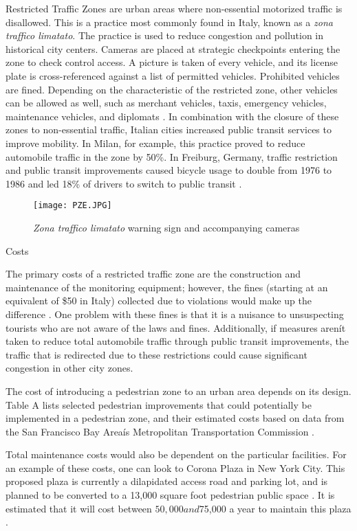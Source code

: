 Restricted Traffic Zones are urban areas where non-essential motorized traffic is disallowed. This is a practice most commonly found in Italy, known as a \emph{zona traffico limatato}. The practice is used to reduce congestion and pollution in historical city centers. Cameras are placed at strategic checkpoints entering the zone to check control access. A picture is taken of every vehicle, and its license plate is cross-referenced against a list of permitted vehicles. Prohibited vehicles are fined. Depending on the characteristic of the restricted zone, other vehicles can be allowed as well, such as merchant vehicles, taxis, emergency vehicles, maintenance vehicles, and diplomats \cite{PZ1}. In combination with the closure of these zones to non-essential traffic, Italian cities increased public transit services to improve mobility. In Milan, for example, this practice proved to reduce automobile traffic in the zone by 50\%. In Freiburg, Germany, traffic restriction and public transit improvements caused bicycle usage to double from 1976 to 1986 and led 18\% of drivers to switch to public transit \cite{PZ2}. 
 
\begin{figure}[h]
\centering
\texttt{[image: PZE.JPG]}
\caption[\emph{Zona traffico limatato} warning sign and accompanying cameras]{\emph{Zona traffico limatato} warning sign and accompanying cameras}\label{fig:PZE}
\end{figure}

Costs

The primary costs of a restricted traffic zone are the construction and maintenance of the monitoring equipment; however, the fines (starting at an equivalent of \$50 in Italy) collected due to violations would make up the difference \cite{PZ1}. One problem with these fines is that it is a nuisance to unsuspecting tourists who are not aware of the laws and fines. Additionally, if measures arenít taken to reduce total automobile traffic through public transit improvements, the traffic that is redirected due to these restrictions could cause significant congestion in other city zones.

The cost of introducing a pedestrian zone to an urban area depends on its design. Table A lists selected pedestrian improvements that could potentially be implemented in a pedestrian zone, and their estimated costs based on data from the San Francisco Bay Areaís Metropolitan Transportation Commission \cite{PZ8}.

 
Total maintenance costs would also be dependent on the particular facilities. For an example of these costs, one can look to Corona Plaza in New York City. This proposed plaza is currently a dilapidated access road and parking lot, and is planned to be converted to a 13,000 square foot pedestrian public space \cite{PZ10}. It is estimated that it will cost between $50,000 and $75,000 a year to maintain this plaza \cite{PZ11}.

